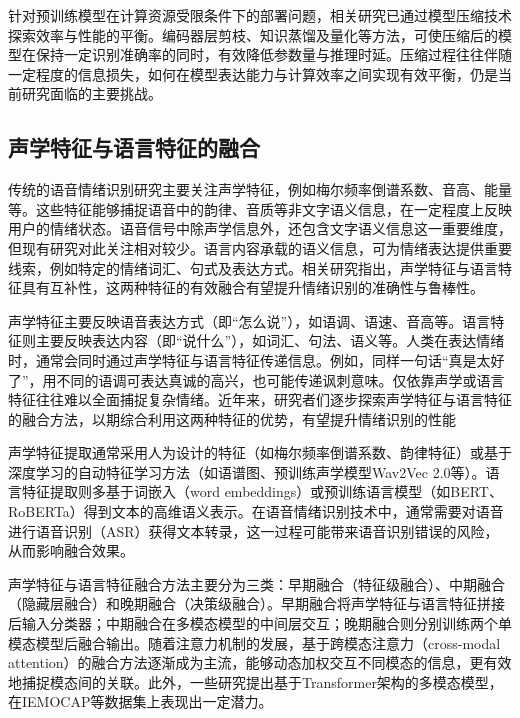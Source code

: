 针对预训练模型在计算资源受限条件下的部署问题，相关研究已通过模型压缩技术探索效率与性能的平衡\cite{leem2024selective,su2023unsupervised,prabhu2024end}。编码器层剪枝、知识蒸馏及量化等方法，可使压缩后的模型在保持一定识别准确率的同时，有效降低参数量与推理时延。压缩过程往往伴随一定程度的信息损失，如何在模型表达能力与计算效率之间实现有效平衡，仍是当前研究面临的主要挑战\cite{ahn2025multitask}。


\subsection{声学特征与语言特征的融合}

传统的语音情绪识别研究主要关注声学特征，例如梅尔频率倒谱系数、音高、能量等。这些特征能够捕捉语音中的韵律、音质等非文字语义信息，在一定程度上反映用户的情绪状态。语音信号中除声学信息外，还包含文字语义信息这一重要维度，但现有研究对此关注相对较少。语言内容承载的语义信息，可为情绪表达提供重要线索，例如特定的情绪词汇、句式及表达方式\cite{shou2026comprehensive,raamkumar2023empathetic}。相关研究指出，声学特征与语言特征具有互补性，这两种特征的有效融合有望提升情绪识别的准确性与鲁棒性\cite{lee2020crossattention,hu2021twostageattentionfusion,santoso2022sawc}。

声学特征主要反映语音表达方式（即“怎么说”），如语调、语速、音高等。语言特征则主要反映表达内容（即“说什么”），如词汇、句法、语义等。人类在表达情绪时，通常会同时通过声学特征与语言特征传递信息。例如，同样一句话“真是太好了”，用不同的语调可表达真诚的高兴，也可能传递讽刺意味。仅依靠声学或语言特征往往难以全面捕捉复杂情绪。近年来，研究者们逐步探索声学特征与语言特征的融合方法，以期综合利用这两种特征的优势，有望提升情绪识别的性能\cite{lee2020crossattention,kim2023focusattention,sun2023auxiliarytasks,shou2026comprehensive}

声学特征提取通常采用人为设计的特征（如梅尔频率倒谱系数、韵律特征）或基于深度学习的自动特征学习方法（如语谱图、预训练声学模型Wav2Vec 2.0等）\cite{baevski2020wav2vec2,pepino2021wav2vec,morais2022sslfeatures,chen2023dwformer}。语言特征提取则多基于词嵌入（word embeddings）或预训练语言模型（如BERT、RoBERTa）得到文本的高维语义表示\cite{lee2020crossattention,sun2023auxiliarytasks,shou2026comprehensive}。在语音情绪识别技术中，通常需要对语音进行语音识别（ASR）获得文本转录，这一过程可能带来语音识别错误的风险，从而影响融合效果\cite{li2023asrintegration}。

声学特征与语言特征融合方法主要分为三类：早期融合（特征级融合）、中期融合（隐藏层融合）和晚期融合（决策级融合）。早期融合将声学特征与语言特征拼接后输入分类器；中期融合在多模态模型的中间层交互；晚期融合则分别训练两个单模态模型后融合输出\cite{hu2021twostageattentionfusion,santoso2022sawc,shou2026comprehensive}。随着注意力机制的发展，基于跨模态注意力（cross-modal attention）的融合方法逐渐成为主流，能够动态加权交互不同模态的信息，更有效地捕捉模态间的关联\cite{lee2020crossattention,kim2023focusattention,sun2023auxiliarytasks,zaidi2023dualattention}。此外，一些研究提出基于Transformer架构的多模态模型，在IEMOCAP等数据集上表现出一定潜力。

